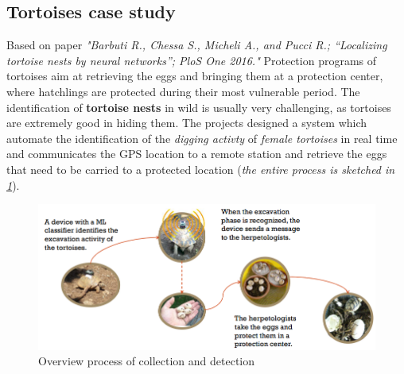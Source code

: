 \documentclass[10pt,a4paper]{report}
\theoremstyle{definition}
\begin{document}
\subsection{Tortoises case study}\label{sec:tortoises-case-study}
Based on paper \textit{"Barbuti R., Chessa S., Micheli A., and Pucci R.; “Localizing tortoise nests by neural networks”; PloS One 2016."}
Protection programs of tortoises aim at retrieving the eggs and bringing them at a protection center, where hatchlings are protected during their most vulnerable period. The identification of \textbf{tortoise nests} in wild is usually very challenging, as tortoises are extremely good in hiding them.
The projects designed a system which automate the identification of the \textit{digging activty} of \textit{female tortoises} in real time and communicates the GPS location to a remote station and retrieve the eggs that need to be carried to a protected location (\textit{the entire process is sketched in \ref{animal-process-schema}}).
\begin{figure}[h]
	\centering\includegraphics[scale=0.50]{images/Pasted image 20230331163227.png}
	\caption{Overview process of collection and detection}
	\label{animal-process-schema}
\end{figure}
\end{document}
